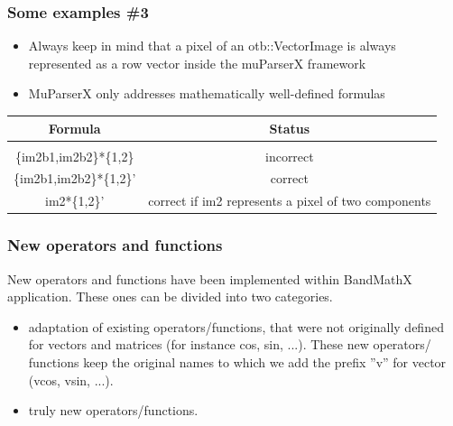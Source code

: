 \documentclass[8pt]{beamer}
\begin{document}
\begin{frame}
\frametitle{Some examples \#3}


\begin{itemize}
\item Always keep in mind that a pixel of an otb::VectorImage is always represented as a row vector inside the muParserX framework
\item MuParserX only addresses mathematically well-defined formulas
\end{itemize}


\begin{center}
\begin{tabular}{c | c}
Formula & Status \\
\hline \\
\{im2b1,im2b2\}*\{1,2\} & incorrect  \\
\{im2b1,im2b2\}*\{1,2\}' & correct  \\
im2*\{1,2\}' & correct if im2 represents a pixel of two components \\

\end{tabular}
\end{center}


\end{frame}


\begin{frame}
\frametitle{New operators and functions}

New operators and functions have been implemented within BandMathX application. These ones can be divided into two categories.

\begin{itemize}
\item adaptation of existing operators/functions, that were not originally defined for vectors and matrices (for instance cos, sin, ...). These new operators/ functions keep the original names to which we add the prefix ”v” for vector (vcos, vsin, ...). 
\item truly new operators/functions.
\end{itemize}
\end{frame}
\end{document}
